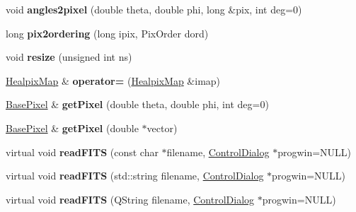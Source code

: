 \begin{DoxyCompactItemize}
\item 
\hypertarget{classHealpixMap_a05937e2850bf0e1f5ebcae8f06e030b1}{
void {\bfseries angles2pixel} (double theta, double phi, long \&pix, int deg=0)}
\label{classHealpixMap_a05937e2850bf0e1f5ebcae8f06e030b1}

\item 
\hypertarget{classHealpixMap_ad3d8ca940adb51639008be0ee60927f3}{
long {\bfseries pix2ordering} (long ipix, PixOrder dord)}
\label{classHealpixMap_ad3d8ca940adb51639008be0ee60927f3}

\item 
\hypertarget{classHealpixMap_a366afcaa0a444a5da7337a9a20d2be30}{
void {\bfseries resize} (unsigned int ns)}
\label{classHealpixMap_a366afcaa0a444a5da7337a9a20d2be30}

\item 
\hypertarget{classHealpixMap_aaddb41d60fe4693d73ed43a1bf243fdd}{
\hyperlink{classHealpixMap}{HealpixMap} \& {\bfseries operator=} (\hyperlink{classHealpixMap}{HealpixMap} \&imap)}
\label{classHealpixMap_aaddb41d60fe4693d73ed43a1bf243fdd}

\item 
\hypertarget{classHealpixMap_ac18af0fdc4bd29adf136579a9947be43}{
\hyperlink{classBasePixel}{BasePixel} \& {\bfseries getPixel} (double theta, double phi, int deg=0)}
\label{classHealpixMap_ac18af0fdc4bd29adf136579a9947be43}

\item 
\hypertarget{classHealpixMap_a274f074eb89a21b0824c18dfa6a1b7cc}{
\hyperlink{classBasePixel}{BasePixel} \& {\bfseries getPixel} (double $\ast$vector)}
\label{classHealpixMap_a274f074eb89a21b0824c18dfa6a1b7cc}

\item 
\hypertarget{classHealpixMap_a05bc5b9ac59844536a1aa93cac52255f}{
virtual void {\bfseries readFITS} (const char $\ast$filename, \hyperlink{classControlDialog}{ControlDialog} $\ast$progwin=NULL)}
\label{classHealpixMap_a05bc5b9ac59844536a1aa93cac52255f}

\item 
\hypertarget{classHealpixMap_a31237a39a541e505a7687f6c586f21f8}{
virtual void {\bfseries readFITS} (std::string filename, \hyperlink{classControlDialog}{ControlDialog} $\ast$progwin=NULL)}
\label{classHealpixMap_a31237a39a541e505a7687f6c586f21f8}

\item 
\hypertarget{classHealpixMap_ae0f5359801064a050b4d81ae6ff87a5f}{
virtual void {\bfseries readFITS} (QString filename, \hyperlink{classControlDialog}{ControlDialog} $\ast$progwin=NULL)}
\label{classHealpixMap_ae0f5359801064a050b4d81ae6ff87a5f}

\end{DoxyCompactItemize}
